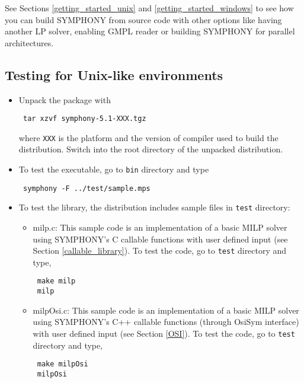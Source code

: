 See Sections \ref{getting_started_unix} and \ref{getting_started_windows} 
to see how you can build SYMPHONY from source code with other options like 
having another LP solver, enabling GMPL reader or building SYMPHONY for 
parallel architectures. 

\subsection{Testing for Unix-like environments}
\begin{itemize}
\item Unpack the package with
{\color{Brown}
\begin{verbatim}
 tar xzvf symphony-5.1-XXX.tgz
\end{verbatim}
}
where \texttt{XXX} is the platform and the version of 
compiler used to build the distribution. 
Switch into the root directory of the unpacked distribution. 

\item To test the executable, go to \texttt{bin} directory and type
{\color{Brown}
\begin{verbatim}
 symphony -F ../test/sample.mps
\end{verbatim}
}
\item To test the library, the distribution
includes sample files in \texttt{test} directory:  
\begin{itemize}
\item milp.c: This sample code is an implementation of a basic MILP solver 
using SYMPHONY's C callable functions with user defined input 
(see Section \ref{callable_library}). 
To test the code, go to \texttt{test} directory and type, 
{\color{Brown}
\begin{verbatim}
 make milp 
 milp
 \end{verbatim}
}
\item milpOsi.c: This sample code is an implementation of a basic MILP 
solver using SYMPHONY's C++ callable functions (through OsiSym interface)
with user defined input (see Section \ref{OSI}). To test the code, 
go to \texttt{test} directory and type, 
{\color{Brown}
\begin{verbatim}
 make milpOsi
 milpOsi
 \end{verbatim}
}
\end{itemize}
\end{itemize}
